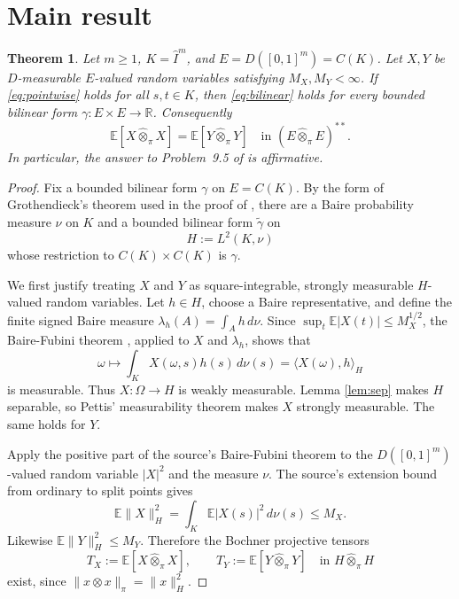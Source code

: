 \documentclass[11pt]{article}
\newtheorem{theorem}{Theorem}
\newcommand{\E}{\mathbb E}
\newcommand{\R}{\mathbb R}
\newcommand{\tp}{\widehat\otimes_\pi}
\begin{document}
\section{Main result}

\begin{theorem}\label{thm:main}
Let $m\ge1$, $K=\widehat I^m$, and
$E=D([0,1]^m)=C(K)$.  Let $X,Y$ be $D$-measurable $E$-valued random
variables satisfying $M_X,M_Y<\infty$.  If \eqref{eq:pointwise} holds for
all $s,t\in K$, then \eqref{eq:bilinear} holds for every bounded bilinear
form $\gamma:E\times E\to\R$.  Consequently
\[
 \E[X\tp X]=\E[Y\tp Y]
 \quad\text{in }(E\tp E)^{**}.
\]
In particular, the answer to Problem~9.5 of \cite{Janson} is affirmative.
\end{theorem}

\begin{proof}
Fix a bounded bilinear form $\gamma$ on $E=C(K)$.  By the form of
Grothendieck's theorem used in the proof of \cite[Theorem~8.8]{Janson}, there
are a Baire probability measure $\nu$ on $K$ and a bounded bilinear form
$\widetilde\gamma$ on
\[
 H:=L^2(K,\nu)
\]
whose restriction to $C(K)\times C(K)$ is $\gamma$.

We first justify treating $X$ and $Y$ as square-integrable, strongly
measurable $H$-valued random variables.  Let $h\in H$, choose a Baire
representative, and define the finite signed Baire measure
$\lambda_h(A)=\int_A h\,d\nu$.  Since
$\sup_t\E|X(t)|\le M_X^{1/2}$, the Baire-Fubini theorem
\cite[Theorem~6.1(iii)]{Janson}, applied to $X$ and $\lambda_h$, shows
that
\[
 \omega\longmapsto \int_K X(\omega,s)h(s)\,d\nu(s)
       =\langle X(\omega),h\rangle_H
\]
is measurable.  Thus $X:\Omega\to H$ is weakly measurable.  Lemma
\ref{lem:sep} makes $H$ separable, so Pettis' measurability theorem makes
$X$ strongly measurable.  The same holds for $Y$.

Apply the positive part of the source's Baire-Fubini theorem to the
$D([0,1]^m)$-valued random variable $|X|^2$ and the measure $\nu$.
The source's extension bound from ordinary to split points gives
\[
 \E\|X\|_H^2
 =\int_K\E|X(s)|^2\,d\nu(s)
 \le M_X.
\]
Likewise $\E\|Y\|_H^2\le M_Y$.  Therefore the Bochner projective tensors
\[
 T_X:=\E[X\tp X],\qquad T_Y:=\E[Y\tp Y]
 \quad\text{in }H\tp H
\]
exist, since $\|x\otimes x\|_\pi=\|x\|_H^2$.


\end{proof}
\end{document}
